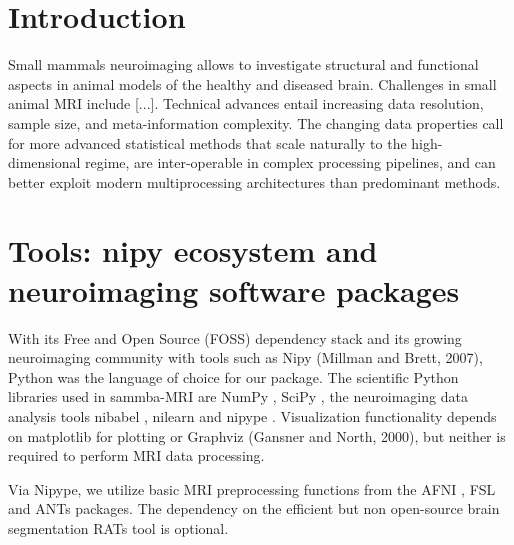 \documentclass[utf8, a4paper, final, crop]{frontiersSCNS} %
\begin{document}
\section{Introduction}
Small mammals neuroimaging allows to investigate structural and functional aspects in animal models of the healthy and diseased brain. Challenges in small animal MRI include [...].
Technical advances entail increasing data resolution, sample size, and meta-information complexity. 
The changing data properties call for more advanced statistical methods that scale naturally to the high-dimensional regime, are inter-operable in complex processing pipelines, and can better exploit modern multiprocessing architectures than predominant methods.
%
%

\section{Tools: nipy ecosystem and neuroimaging software packages}

With its Free and Open Source (FOSS)
dependency stack and its growing neuroimaging community with tools such as
Nipy (Millman and Brett, 2007), Python was the language of choice for our
package.
%
%
%
The scientific Python libraries used in sammba-MRI are
NumPy \citep{oliphant2006guide}, SciPy \citep{millman2011python}, the neuroimaging 
data analysis tools nibabel \citep{nibabel}, nilearn \citep{abraham2014machine} and 
nipype \citep{gorgolewski2011nipype}. %
Visualization functionality depends on matplotlib \citep{hunter2007matplotlib} for 
plotting or Graphviz (Gansner and North, 2000), but neither is required to perform
MRI data processing.

Via Nipype, we utilize basic MRI preprocessing
functions from the AFNI \citep{cox1996afni}, FSL \citep{jenkinson2012fsl} and ANTs 
\citep{avants2009advanced}
packages. The dependency on the efficient but non open-source brain segmentation RATs 
tool \citep{oguz2014rats} is optional.
\end{document}
